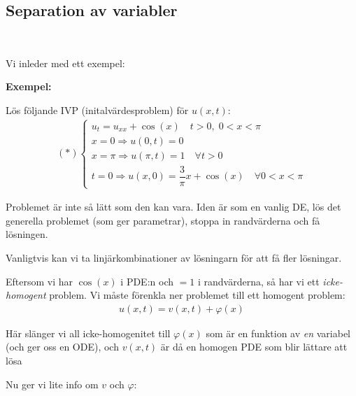 \subsection{Separation av variabler}\hfill\\\par
\noindent Vi inleder med ett exempel:
\par\bigskip
\noindent\textbf{Exempel:}\par
\noindent Lös följande IVP (initalvärdesproblem) för $u(x,t)$:
\begin{equation*}
  \begin{gathered}
    (*)\begin{cases}
      u_t = u_{xx}+\cos(x)\quad t>0,\; 0<x<\pi\\
      x=0\Rightarrow u(0,t) = 0\\
      x=\pi\Rightarrow u(\pi,t) = 1\quad\forall t>0\\
      t=0\Rightarrow u(x,0)=\dfrac{3}{\pi}x+\cos(x)\quad\forall 0< x< \pi
    \end{cases}
  \end{gathered}
\end{equation*}
\par\bigskip
\noindent Problemet är inte så lätt som den kan vara. Iden är som en vanlig DE, lös det generella problemet (som ger parametrar), stoppa in randvärderna och få lösningen. 
\par\bigskip
\noindent Vanligtvis kan vi ta linjärkombinationer av lösningarn för att få fler lösningar.
\par\bigskip
\noindent Eftersom vi har $\cos(x)$ i PDE:n och $=1$ i randvärderna, så har vi ett \textit{icke-homogent} problem. Vi måste förenkla ner problemet till ett homogent problem:
\begin{equation*}
  \begin{gathered}
    u(x,t) = v(x,t) +\varphi(x)
  \end{gathered}
\end{equation*}\par
\noindent Här slänger vi all icke-homogenitet till $\varphi(x)$ som är en funktion av \textit{en} variabel (och ger oss en ODE), och $v(x,t)$ är då en homogen PDE som blir lättare att lösa
\par\bigskip
\noindent Nu ger vi lite info om $v$ och $\varphi$:
